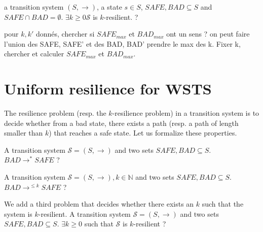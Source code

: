 {a transition system $(S,\rightarrow)$, a state $s \in S$, $SAFE, BAD \subseteq S$ and $SAFE \cap BAD = \emptyset$.}
{$\exists k \geq 0  \mathscr{S}$ is $k$-resilient. ?\newline}
\fi


pour $k,k'$ donnés, chercher si $SAFE_{max}$ et $BAD_{max}$ ont un sens ? on peut faire l'union des SAFE, SAFE' et des BAD, BAD' prendre le max des k. Fixer k, chercher et calculer $SAFE_{max}$ et $BAD_{max}$.



\section{Uniform resilience for WSTS}


The resilience problem (resp. the $k$-resilience problem) in a transition system is to decide whether from a bad state, there exists a path (resp. a path of length smaller than $k$) that reaches a safe state. Let us formalize these properties.

{A transition system $\mathscr{S}=(S,\rightarrow)$ and two sets $SAFE, BAD \subseteq S$.}
{$BAD \longrightarrow^{*} SAFE$ ?\newline}
%

{A transition system $\mathscr{S}=(S,\rightarrow), k \in \mathbb{N}$ and two sets $SAFE, BAD \subseteq S$.}
{$BAD \longrightarrow^{\leq k} SAFE$ ?\newline}

We add a third problem that decides whether there exists an $k$ such  that the system is $k$-resilient.
%
{A transition system $\mathscr{S}=(S,\rightarrow)$ and two sets $SAFE, BAD \subseteq S$.}
{$\exists k \geq 0$ such that $\mathscr{S}$ is $k$-resilient ?\newline}



